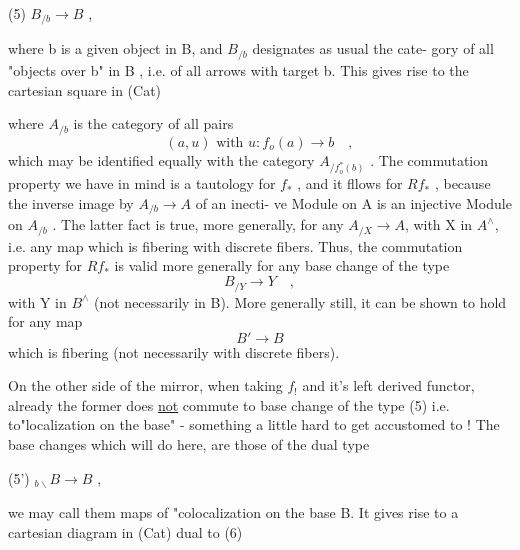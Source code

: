 
(5) \qquad $B_{/b} \longrightarrow B$ \quad ,

where b is a given object in B, and $B_{/b}$ designates as usual the cate-%
gory of all "objects over b" in B , i.e. of all arrows  with target b.
This gives rise to the cartesian square in (Cat)


where $A_{/b}$ is the category of all pairs
\[ (a,u) \text{ with } u : f_{o}(a) \longrightarrow b \quad , \]
which may be identified equally with the category $A_{/f_{o}^{*}(b)}$ . The
commutation property we have in mind is a tautology for $f_{*}$ , and it
fllows for $Rf_{*}$ , because the inverse image by $A_{/b} \to A$ of an inecti-%
ve Module on A is an injective Module on $A_{/b}$ . \hand{\unsure{[}}The latter fact is
true, more generally, for any   $A_{/X} \to A$, with X in $A^{\wedge}$, i.e.
any map which is fibering with discrete fibers.\hand{\unsure{]}} Thus, the commutation
property for $Rf_{*}$ is valid more generally for any base change of the
type
\[ B_{/Y} \longrightarrow Y \quad , \]
with Y in $B^{\wedge}$ (not necessarily in B). More generally still, it can be
shown to hold for any map
\[ B' \longrightarrow B \]
which is fibering (not necessarily with discrete fibers).

On the other side of the mirror, when taking $f_{!}$ and it's left
derived functor, already the former  does \uline{not} commute to base change
of the type (5) i.e. to"localization on the base" - something a little
hard to get accustomed to ! The base changes which will do here, are
those of the dual type

(5') \qquad ${}_{b\backslash}B \longrightarrow B$ \quad ,

we may call them maps of "colocalization on the base B.  It gives
rise to a cartesian diagram in (Cat) dual to (6)


